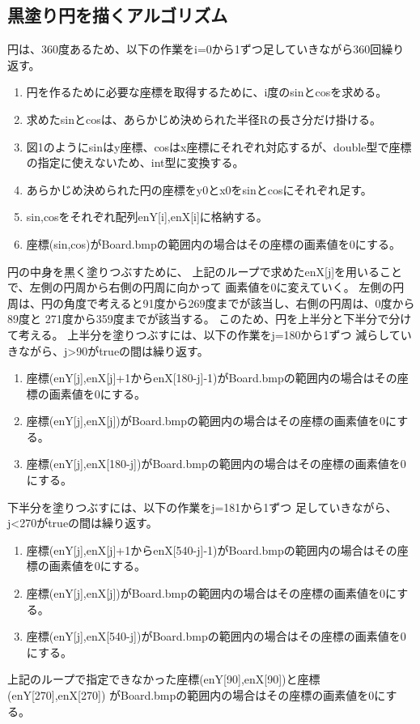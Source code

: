 \documentclass{jsarticle}
\begin{document}
\subsection{黒塗り円を描くアルゴリズム}
円は、360度あるため、以下の作業をi=0から1ずつ足していきながら360回繰り返す。
\begin{enumerate}
  \item 円を作るために必要な座標を取得するために、i度のsinとcosを求める。
  \item 求めたsinとcosは、あらかじめ決められた半径Rの長さ分だけ掛ける。
  \item 図1のようにsinはy座標、cosはx座標にそれぞれ対応するが、double型で座標の指定に使えないため、int型に変換する。
  \item あらかじめ決められた円の座標をy0とx0をsinとcosにそれぞれ足す。
  \item sin,cosをそれぞれ配列enY[i],enX[i]に格納する。
  \item 座標(sin,cos)がBoard.bmpの範囲内の場合はその座標の画素値を0にする。
\end{enumerate}
円の中身を黒く塗りつぶすために、
上記のループで求めたenX[j]を用いることで、左側の円周から右側の円周に向かって
画素値を0に変えていく。
左側の円周は、円の角度で考えると91度から269度までが該当し、右側の円周は、0度から89度と
271度から359度までが該当する。
このため、円を上半分と下半分で分けて考える。
上半分を塗りつぶすには、以下の作業をj=180から1ずつ
減らしていきながら、j\textgreater90がtrueの間は繰り返す。
\begin{enumerate}
  \item 座標(enY[j],enX[j]+1からenX[180-j]-1)がBoard.bmpの範囲内の場合はその座標の画素値を0にする。
  \item 座標(enY[j],enX[j])がBoard.bmpの範囲内の場合はその座標の画素値を0にする。
  \item 座標(enY[j],enX[180-j])がBoard.bmpの範囲内の場合はその座標の画素値を0にする。
\end{enumerate}
下半分を塗りつぶすには、以下の作業をj=181から1ずつ
足していきながら、j\textless270がtrueの間は繰り返す。
\begin{enumerate}
  \item 座標(enY[j],enX[j]+1からenX[540-j]-1)がBoard.bmpの範囲内の場合はその座標の画素値を0にする。
  \item 座標(enY[j],enX[j])がBoard.bmpの範囲内の場合はその座標の画素値を0にする。
  \item 座標(enY[j],enX[540-j])がBoard.bmpの範囲内の場合はその座標の画素値を0にする。
\end{enumerate}
上記のループで指定できなかった座標(enY[90],enX[90])と座標(enY[270],enX[270])
がBoard.bmpの範囲内の場合はその座標の画素値を0にする。
\end{document}
